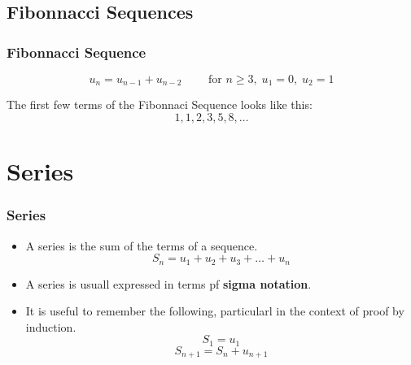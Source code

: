 \documentclass{beamer}
\begin{document}
\subsection{Fibonnacci Sequences}
\begin{frame}
\frametitle{Fibonnacci Sequence}

\[ u_n = u_{n-1} + u_{n-2} \qquad \mbox{ for } n \geq 3 ,\; u_1=0,\;u_2=1 \]


The first few terms of the Fibonnaci Sequence looks like this:
\[ 1, 1, 2, 3, 5, 8, \ldots\]


\end{frame}

\section{Series}
\begin{frame}
\frametitle{Series}
\large
\begin{itemize}
\item A series is the sum of the terms of a sequence. 
\[ S_n = u_1 + u_2 + u_3+ \ldots +u_n\]
\item A series is usuall expressed in terms pf \textbf{sigma notation}.
\item It is useful to remember the following, particularl in the context of proof by induction.
\[S_1 = u_1\]
\[S_{n+1} = S_n + u_{n+1}\]

\end{itemize}

\end{frame}

\end{document}
